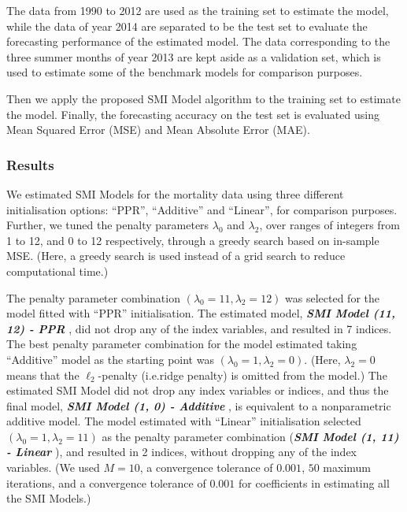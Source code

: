 \documentclass[11pt,a4paper,]{article}
\begin{document}
The data from 1990 to 2012 are used as the training set to estimate the
model, while the data of year 2014 are separated to be the test set to
evaluate the forecasting performance of the estimated model. The data
corresponding to the three summer months of year 2013 are kept aside as
a validation set, which is used to estimate some of the benchmark models
for comparison purposes.

Then we apply the proposed SMI Model algorithm to the training set to
estimate the model. Finally, the forecasting accuracy on the test set is
evaluated using Mean Squared Error (MSE) and Mean Absolute Error (MAE).

\hypertarget{results}{%
\subsubsection{Results}\label{results}}

We estimated SMI Models for the mortality data using three different
initialisation options: ``PPR'', ``Additive'' and ``Linear'', for
comparison purposes. Further, we tuned the penalty parameters
\(\lambda_{0}\) and \(\lambda_{2}\), over ranges of integers from 1 to
12, and 0 to 12 respectively, through a greedy search based on in-sample
MSE. (Here, a greedy search is used instead of a grid search to reduce
computational time.)

The penalty parameter combination
\((\lambda_{0} = 11, \lambda_{2} = 12)\) was selected for the model
fitted with ``PPR'' initialisation. The estimated model,
\textbf{\emph{SMI Model (11, 12) - PPR }}, did not drop any of the index
variables, and resulted in 7 indices. The best penalty parameter
combination for the model estimated taking ``Additive'' model as the
starting point was \((\lambda_{0} = 1, \lambda_{2} = 0)\). (Here,
\(\lambda_{2} = 0\) means that the \(\ell_{2}\)-penalty (i.e.ridge
penalty) is omitted from the model.) The estimated SMI Model did not
drop any index variables or indices, and thus the final model,
\textbf{\emph{SMI Model (1, 0) - Additive }}, is equivalent to a
nonparametric additive model. The model estimated with ``Linear''
initialisation selected \((\lambda_{0} = 1, \lambda_{2} = 11)\) as the
penalty parameter combination (\textbf{\emph{SMI Model (1, 11) - Linear
}}), and resulted in 2 indices, without dropping any of the index
variables. (We used \(M = 10\), a convergence tolerance of \(0.001\),
\(50\) maximum iterations, and a convergence tolerance of \(0.001\) for
coefficients in estimating all the SMI Models.)
\end{document}
